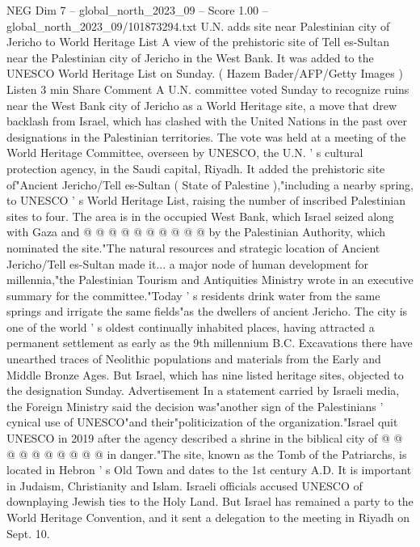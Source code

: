 \begin{textsample}{NEG Dim 7 – global\_north\_2023\_09 – Score 1.00 – global\_north\_2023\_09/101873294.txt}  \label{ex:f7_neg_084}
U.N. adds site near Palestinian city of Jericho to World Heritage List A view of the prehistoric site of Tell es-Sultan near the Palestinian city of Jericho in the West Bank.
It was added to the UNESCO World Heritage List on Sunday. ( Hazem Bader/AFP/Getty Images ) Listen 3 min Share Comment A U.N. committee voted Sunday to recognize ruins near the West Bank city of Jericho as a World Heritage site, a move that drew backlash from Israel, which has clashed with the United Nations in the past over designations in the Palestinian territories.
The vote was held at a meeting of the World Heritage Committee, overseen by UNESCO, the U.N. ' s cultural protection agency, in the Saudi capital, Riyadh.
It added the prehistoric site of"Ancient Jericho/Tell es-Sultan ( State of Palestine ),"including a nearby spring, to UNESCO ' s World Heritage List, raising the number of inscribed Palestinian sites to four.
The area is in the occupied West Bank, which Israel seized along with Gaza and @ @ @ @ @ @ @ @ @ @ by the Palestinian Authority, which nominated the site."The natural resources and strategic location of Ancient Jericho/Tell es-Sultan made it... a major node of human development for millennia,"the Palestinian Tourism and Antiquities Ministry wrote in an executive summary for the committee."Today ' s residents drink water from the same springs and irrigate the same fields"as the dwellers of ancient Jericho.
The city is one of the world ' s oldest continually inhabited places, having attracted a permanent settlement as early as the 9th millennium B.C.
Excavations there have unearthed traces of Neolithic populations and materials from the Early and Middle Bronze Ages.
But Israel, which has nine listed heritage sites, objected to the designation Sunday.
Advertisement In a statement carried by Israeli media, the Foreign Ministry said the decision was"another sign of the Palestinians ' cynical use of UNESCO"and their"politicization of the organization."Israel quit UNESCO in 2019 after the agency described a shrine in the biblical city of @ @ @ @ @ @ @ @ @ @ in danger."The site, known as the Tomb of the Patriarchs, is located in Hebron ' s Old Town and dates to the 1st century A.D.
It is important in Judaism, Christianity and Islam.
Israeli officials accused UNESCO of downplaying Jewish ties to the Holy Land.
But Israel has remained a party to the World Heritage Convention, and it sent a delegation to the meeting in Riyadh on Sept. 10.

\end{textsample}
